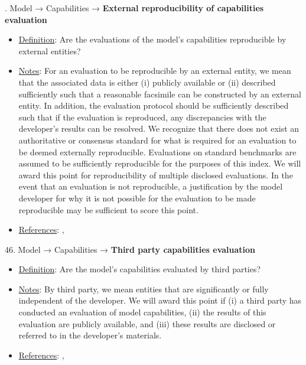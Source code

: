 . Model → Capabilities → \textbf{External reproducibility of capabilities evaluation}
\vspace{-\parskip}
\begin{itemize}
\item
\underline{Definition}: Are the evaluations of the model’s capabilities reproducible by external entities?
\item
\underline{Notes}: For an evaluation to be reproducible by an external entity, we mean that the associated data is either (i) publicly available or (ii) described sufficiently such that a reasonable facsimile can be constructed by an external entity. In addition, the evaluation protocol should be sufficiently described such that if the evaluation is reproduced, any discrepancies with the developer's results can be resolved. We recognize that there does not exist an authoritative or consensus standard for what is required for an evaluation to be deemed externally reproducible. Evaluations on standard benchmarks are assumed to be sufficiently reproducible for the purposes of this index. We will award this point for reproducibility of multiple disclosed evaluations. In the event that an evaluation is not reproducible, a justification by the model developer for why it is not possible for the evaluation to be made reproducible may be sufficient to score this point.
\item
\underline{References}: \citet{kapoor2023leakage}, \citet{liang2022helm}
\end{itemize}


46. Model → Capabilities → \textbf{Third party capabilities evaluation}
\vspace{-\parskip}
\begin{itemize}
\item
\underline{Definition}: Are the model’s capabilities evaluated by third parties?
\item
\underline{Notes}: By third party, we mean entities that are significantly or fully independent of the developer. We will award this point if (i) a third party has conducted an evaluation of model capabilities, (ii) the results of this evaluation are publicly available, and (iii) these results are disclosed or referred to in the developer’s materials.
\item
\underline{References}: \citet{raji2022audit}, \citet{liang2022helm}
\end{itemize}


